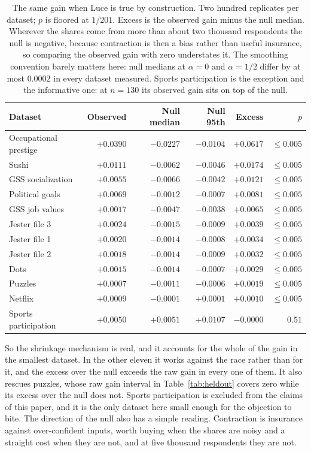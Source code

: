 \documentclass[11pt]{article}
\begin{document}
\begin{table}[ht]
\centering
\small
\begin{tabular}{lrrrrr}
\toprule
Dataset & Observed & Null median & Null 95th & Excess & $p$ \\
\midrule
Occupational prestige & $+0.0390$ & $-0.0227$ & $-0.0104$ & $+0.0617$ & $\le 0.005$ \\
Sushi & $+0.0111$ & $-0.0062$ & $-0.0046$ & $+0.0174$ & $\le 0.005$ \\
GSS socialization & $+0.0055$ & $-0.0066$ & $-0.0042$ & $+0.0121$ & $\le 0.005$ \\
Political goals & $+0.0069$ & $-0.0012$ & $-0.0007$ & $+0.0081$ & $\le 0.005$ \\
GSS job values & $+0.0017$ & $-0.0047$ & $-0.0038$ & $+0.0065$ & $\le 0.005$ \\
Jester file 3 & $+0.0024$ & $-0.0015$ & $-0.0009$ & $+0.0039$ & $\le 0.005$ \\
Jester file 1 & $+0.0020$ & $-0.0014$ & $-0.0008$ & $+0.0034$ & $\le 0.005$ \\
Jester file 2 & $+0.0018$ & $-0.0014$ & $-0.0009$ & $+0.0032$ & $\le 0.005$ \\
Dots & $+0.0015$ & $-0.0014$ & $-0.0007$ & $+0.0029$ & $\le 0.005$ \\
Puzzles & $+0.0007$ & $-0.0011$ & $-0.0006$ & $+0.0019$ & $\le 0.005$ \\
Netflix & $+0.0009$ & $-0.0001$ & $+0.0001$ & $+0.0010$ & $\le 0.005$ \\
\midrule
Sports participation & $+0.0050$ & $+0.0051$ & $+0.0107$ & $-0.0000$ & $0.51$ \\
\bottomrule
\end{tabular}
\caption{The same gain when Luce is true by construction. Two hundred replicates per
dataset; $p$ is floored at $1/201$. Excess is the observed gain minus the null median.
Wherever the shares come from more than about two thousand respondents the null is
negative, because contraction is then a bias rather than useful insurance, so
comparing the observed gain with zero understates it. The smoothing convention barely
matters here: null medians at $\alpha = 0$ and $\alpha = 1/2$ differ by at most
$0.0002$ in every dataset measured. Sports participation is the exception and the
informative one: at $n = 130$ its observed gain sits on top of the null.}
\label{tab:null}
\end{table}

So the shrinkage mechanism is real, and it accounts for the whole of the gain in the
smallest dataset. In the other eleven it works against the race rather than for it,
and the excess over the null exceeds the raw gain in every one of them. It also
rescues puzzles, whose raw gain interval in Table~\ref{tab:heldout} covers zero while
its excess over the null does not. Sports participation is excluded from the claims of
this paper, and it is the only dataset here small enough for the objection to bite. The direction of the null also has a simple reading.
Contraction is insurance against over-confident inputs, worth buying when the shares
are noisy and a straight cost when they are not, and at five thousand respondents they
are not.
\end{document}
